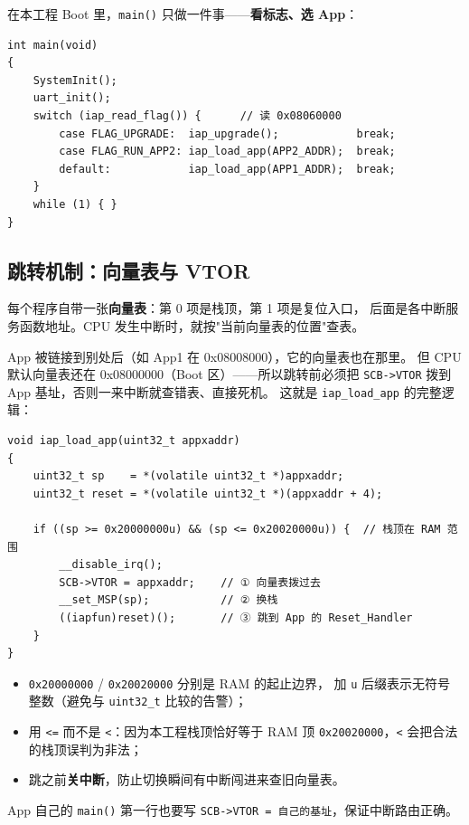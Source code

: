 在本工程 Boot 里，\texttt{main()} 只做一件事——\textbf{看标志、选 App}：

\begin{lstlisting}[style=generic]
int main(void)
{
    SystemInit();
    uart_init();
    switch (iap_read_flag()) {      // 读 0x08060000
        case FLAG_UPGRADE:  iap_upgrade();            break;
        case FLAG_RUN_APP2: iap_load_app(APP2_ADDR);  break;
        default:            iap_load_app(APP1_ADDR);  break;
    }
    while (1) { }
}
\end{lstlisting}

\subsection{跳转机制：向量表与 VTOR}

每个程序自带一张\textbf{向量表}：第 0 项是栈顶，第 1 项是复位入口，
后面是各中断服务函数地址。CPU 发生中断时，就按"当前向量表的位置"查表。

App 被链接到别处后（如 App1 在 0x08008000），它的向量表也在那里。
但 CPU 默认向量表还在 0x08000000（Boot 区）——所以跳转前必须把
\texttt{SCB->VTOR} 拨到 App 基址，否则一来中断就查错表、直接死机。
这就是 \texttt{iap\_load\_app} 的完整逻辑：

\begin{lstlisting}[style=generic]
void iap_load_app(uint32_t appxaddr)
{
    uint32_t sp    = *(volatile uint32_t *)appxaddr;
    uint32_t reset = *(volatile uint32_t *)(appxaddr + 4);

    if ((sp >= 0x20000000u) && (sp <= 0x20020000u)) {  // 栈顶在 RAM 范围
        __disable_irq();
        SCB->VTOR = appxaddr;    // ① 向量表拨过去
        __set_MSP(sp);           // ② 换栈
        ((iapfun)reset)();       // ③ 跳到 App 的 Reset_Handler
    }
}
\end{lstlisting}

\begin{itemize}
  \item \texttt{0x20000000} / \texttt{0x20020000} 分别是 RAM 的起止边界，
        加 \texttt{u} 后缀表示无符号整数（避免与 \texttt{uint32\_t} 比较的告警）；
  \item 用 \texttt{<=} 而不是 \texttt{<}：因为本工程栈顶恰好等于 RAM 顶
        \texttt{0x20020000}，\texttt{<} 会把合法的栈顶误判为非法；
  \item 跳之前\textbf{关中断}，防止切换瞬间有中断闯进来查旧向量表。
\end{itemize}

App 自己的 \texttt{main()} 第一行也要写
\texttt{SCB->VTOR = 自己的基址}，保证中断路由正确。

